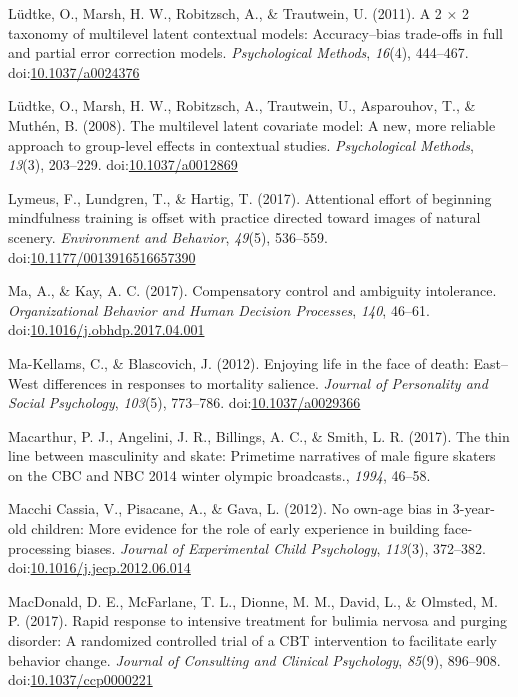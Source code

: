\documentclass[english,man]{apa6}
\theoremstyle{definition}
\theoremstyle{definition}
\theoremstyle{definition}
\theoremstyle{remark}
\begin{document}
\hypertarget{ref-Ludtke2011}{}
Lüdtke, O., Marsh, H. W., Robitzsch, A., \& Trautwein, U. (2011). A 2 ×
2 taxonomy of multilevel latent contextual models: Accuracy--bias
trade-offs in full and partial error correction models.
\emph{Psychological Methods}, \emph{16}(4), 444--467.
doi:\href{https://doi.org/10.1037/a0024376}{10.1037/a0024376}

\hypertarget{ref-Ludtke2008}{}
Lüdtke, O., Marsh, H. W., Robitzsch, A., Trautwein, U., Asparouhov, T.,
\& Muthén, B. (2008). The multilevel latent covariate model: A new, more
reliable approach to group-level effects in contextual studies.
\emph{Psychological Methods}, \emph{13}(3), 203--229.
doi:\href{https://doi.org/10.1037/a0012869}{10.1037/a0012869}

\hypertarget{ref-Lymeus2017}{}
Lymeus, F., Lundgren, T., \& Hartig, T. (2017). Attentional effort of
beginning mindfulness training is offset with practice directed toward
images of natural scenery. \emph{Environment and Behavior},
\emph{49}(5), 536--559.
doi:\href{https://doi.org/10.1177/0013916516657390}{10.1177/0013916516657390}

\hypertarget{ref-Ma2017}{}
Ma, A., \& Kay, A. C. (2017). Compensatory control and ambiguity
intolerance. \emph{Organizational Behavior and Human Decision
Processes}, \emph{140}, 46--61.
doi:\href{https://doi.org/10.1016/j.obhdp.2017.04.001}{10.1016/j.obhdp.2017.04.001}

\hypertarget{ref-Ma-Kellams2012}{}
Ma-Kellams, C., \& Blascovich, J. (2012). Enjoying life in the face of
death: East--West differences in responses to mortality salience.
\emph{Journal of Personality and Social Psychology}, \emph{103}(5),
773--786. doi:\href{https://doi.org/10.1037/a0029366}{10.1037/a0029366}

\hypertarget{ref-Macarthur2017}{}
Macarthur, P. J., Angelini, J. R., Billings, A. C., \& Smith, L. R.
(2017). The thin line between masculinity and skate: Primetime
narratives of male figure skaters on the CBC and NBC 2014 winter olympic
broadcasts., \emph{1994}, 46--58.

\hypertarget{ref-MacchiCassia2012}{}
Macchi Cassia, V., Pisacane, A., \& Gava, L. (2012). No own-age bias in
3-year-old children: More evidence for the role of early experience in
building face-processing biases. \emph{Journal of Experimental Child
Psychology}, \emph{113}(3), 372--382.
doi:\href{https://doi.org/10.1016/j.jecp.2012.06.014}{10.1016/j.jecp.2012.06.014}

\hypertarget{ref-MacDonald2017a}{}
MacDonald, D. E., McFarlane, T. L., Dionne, M. M., David, L., \&
Olmsted, M. P. (2017). Rapid response to intensive treatment for bulimia
nervosa and purging disorder: A randomized controlled trial of a CBT
intervention to facilitate early behavior change. \emph{Journal of
Consulting and Clinical Psychology}, \emph{85}(9), 896--908.
doi:\href{https://doi.org/10.1037/ccp0000221}{10.1037/ccp0000221}
\end{document}
